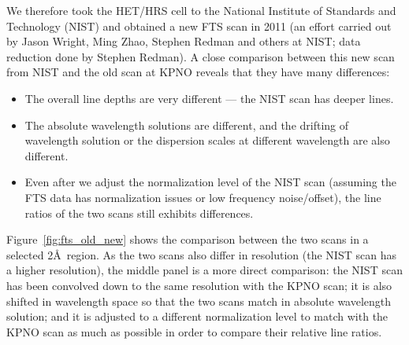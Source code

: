We therefore took the HET/HRS cell to the National Institute of
Standards and Technology (NIST) and obtained a new FTS scan in 2011
(an effort carried out by Jason Wright, Ming Zhao, Stephen Redman and
others at NIST; data reduction done by Stephen Redman). A close
comparison between this new scan from NIST and the old scan at KPNO
reveals that they have many differences:
\begin{itemize}
  \item The overall line depths are very different --- the NIST scan
    has deeper lines.
  \item The absolute wavelength solutions are different, and the
    drifting of wavelength solution or the dispersion scales at
    different wavelength are also different.
  \item Even after we adjust the normalization level of the NIST
    scan (assuming the FTS data has normalization issues or low
    frequency noise/offset), the line ratios of the two scans still
    exhibits differences.
\end{itemize}

Figure~\ref{fig:fts_old_new} shows the comparison between the two
scans in a selected 2\AA\ region. As the two scans also differ in
resolution (the NIST scan has a higher resolution), the middle panel
is a more direct comparison: the NIST scan has been convolved down to
the same resolution with the KPNO scan; it is also shifted in
wavelength space so that the two scans match in absolute wavelength
solution; and it is adjusted to a different normalization level to
match with the KPNO scan as much as possible in order to compare their
relative line ratios.

